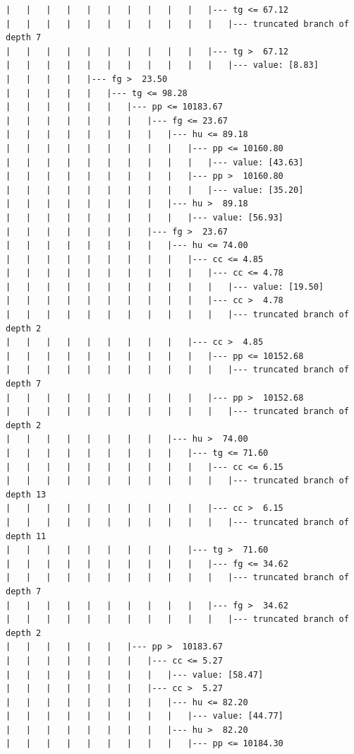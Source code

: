 \documentclass[UTF8, a4paper]{ctexart}
\begin{document}
\begin{lstlisting}
|   |   |   |   |   |   |   |   |   |   |--- tg <= 67.12
|   |   |   |   |   |   |   |   |   |   |   |--- truncated branch of depth 7
|   |   |   |   |   |   |   |   |   |   |--- tg >  67.12
|   |   |   |   |   |   |   |   |   |   |   |--- value: [8.83]
|   |   |   |   |--- fg >  23.50
|   |   |   |   |   |--- tg <= 98.28
|   |   |   |   |   |   |--- pp <= 10183.67
|   |   |   |   |   |   |   |--- fg <= 23.67
|   |   |   |   |   |   |   |   |--- hu <= 89.18
|   |   |   |   |   |   |   |   |   |--- pp <= 10160.80
|   |   |   |   |   |   |   |   |   |   |--- value: [43.63]
|   |   |   |   |   |   |   |   |   |--- pp >  10160.80
|   |   |   |   |   |   |   |   |   |   |--- value: [35.20]
|   |   |   |   |   |   |   |   |--- hu >  89.18
|   |   |   |   |   |   |   |   |   |--- value: [56.93]
|   |   |   |   |   |   |   |--- fg >  23.67
|   |   |   |   |   |   |   |   |--- hu <= 74.00
|   |   |   |   |   |   |   |   |   |--- cc <= 4.85
|   |   |   |   |   |   |   |   |   |   |--- cc <= 4.78
|   |   |   |   |   |   |   |   |   |   |   |--- value: [19.50]
|   |   |   |   |   |   |   |   |   |   |--- cc >  4.78
|   |   |   |   |   |   |   |   |   |   |   |--- truncated branch of depth 2
|   |   |   |   |   |   |   |   |   |--- cc >  4.85
|   |   |   |   |   |   |   |   |   |   |--- pp <= 10152.68
|   |   |   |   |   |   |   |   |   |   |   |--- truncated branch of depth 7
|   |   |   |   |   |   |   |   |   |   |--- pp >  10152.68
|   |   |   |   |   |   |   |   |   |   |   |--- truncated branch of depth 2
|   |   |   |   |   |   |   |   |--- hu >  74.00
|   |   |   |   |   |   |   |   |   |--- tg <= 71.60
|   |   |   |   |   |   |   |   |   |   |--- cc <= 6.15
|   |   |   |   |   |   |   |   |   |   |   |--- truncated branch of depth 13
|   |   |   |   |   |   |   |   |   |   |--- cc >  6.15
|   |   |   |   |   |   |   |   |   |   |   |--- truncated branch of depth 11
|   |   |   |   |   |   |   |   |   |--- tg >  71.60
|   |   |   |   |   |   |   |   |   |   |--- fg <= 34.62
|   |   |   |   |   |   |   |   |   |   |   |--- truncated branch of depth 7
|   |   |   |   |   |   |   |   |   |   |--- fg >  34.62
|   |   |   |   |   |   |   |   |   |   |   |--- truncated branch of depth 2
|   |   |   |   |   |   |--- pp >  10183.67
|   |   |   |   |   |   |   |--- cc <= 5.27
|   |   |   |   |   |   |   |   |--- value: [58.47]
|   |   |   |   |   |   |   |--- cc >  5.27
|   |   |   |   |   |   |   |   |--- hu <= 82.20
|   |   |   |   |   |   |   |   |   |--- value: [44.77]
|   |   |   |   |   |   |   |   |--- hu >  82.20
|   |   |   |   |   |   |   |   |   |--- pp <= 10184.30

\end{lstlisting}
\end{document}
